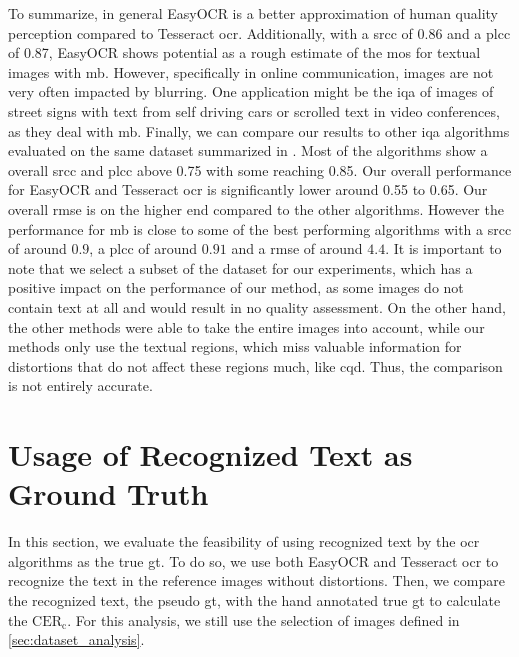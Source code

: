 To summarize, in general EasyOCR is a better approximation of human quality perception compared to Tesseract \gls{ocr}.
Additionally, with a \gls{srcc} of 0.86 and a \gls{plcc} of 0.87, EasyOCR shows potential as a rough estimate of the \gls{mos} for textual images with \gls{mb}.
However, specifically in online communication, images are not very often impacted by blurring.
One application might be the \gls{iqa} of images of street signs with text from self driving cars or scrolled text in video conferences, as they deal with \gls{mb}.
Finally, we can compare our results to other \gls{iqa} algorithms evaluated on the same dataset summarized in \cite{ni_esim_2017}.
Most of the algorithms show a overall \gls{srcc} and \gls{plcc} above 0.75 with some reaching 0.85.
Our overall performance for EasyOCR and Tesseract \gls{ocr} is significantly lower around 0.55 to 0.65.
Our overall \gls{rmse} is on the higher end compared to the other algorithms.
However the performance for \gls{mb} is close to some of the best performing algorithms \cite{state_of_the_art_scciqa} with a \gls{srcc} of around $0.9$, a \gls{plcc} of around $0.91$ and a \gls{rmse} of around $4.4$.
It is important to note that we select a subset of the dataset for our experiments, which has a positive impact on the performance of our method, as some images do not contain text at all and would result in no quality assessment.
On the other hand, the other methods were able to take the entire images into account, while our methods only use the textual regions, which miss valuable information for distortions that do not affect these regions much, like \gls{cqd}.
Thus, the comparison is not entirely accurate.




    
\section{Usage of Recognized Text as Ground Truth}
\label{sec:usage_of_recognized_text_as_ground_truth}

In this section, we evaluate the feasibility of using recognized text by the \gls{ocr} algorithms as the true \gls{gt}.
To do so, we use both EasyOCR and Tesseract \gls{ocr} to recognize the text in the reference images without distortions.
Then, we compare the recognized text, the pseudo \gls{gt}, with the hand annotated true \gls{gt} to calculate the $\text{CER}_{\text{c}}$.
For this analysis, we still use the selection of images defined in \autoref{sec:dataset_analysis}.

